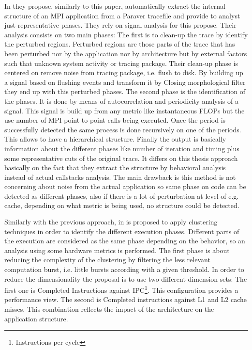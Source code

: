 \documentclass[10pt]{report}
\begin{document}
In \cite{casas2007automatic} they propose, similarly to this paper, 
automatically extract the internal structure of an MPI application from a
Paraver tracefile and provide to analyst just representative phases. 
They rely on signal analysis for this propose. 
Their analysis consists on two main phases:
The first is to clean-up the trace by identify the perturbed regions.
Perturbed regions are those parts of the trace that has been perturbed nor by
the application nor by architecture but by external factors such that unknown
system activity or tracing package. Their clean-up phase is centered on remove
noise from tracing package, i.e. flush to disk. By building up a signal based
on flushing events and transform it by Closing morphological filter they end up
with this perturbed phases. The second phase is the identification of the
phases. It is done by means of autocorrelation and periodicity analysis of a
signal. This signal is build up from any metric like instantaneous FLOPs but the
use number of MPI point to point calls being executed. Once the period is
successfully detected the same process is done recursively on one of the
periods. This allows to have a hierarchical structure. Finally the output is
basically information about the different phases like number of iteration and
timing plus some representative cuts of the original trace. It differs on this
thesis approach basically on the fact that they extract the structure by
behavioral analysis instead of actual callstacks analysis. The main drawback is
this method is not concerning about noise from the actual application so same
phase on code can be detected as different phases, also if there is a lot of
perturbation at level of e.g. cache, depending on what metric is being used, no
structure could be detected. 

Similarly with the previous approach, in 
\cite{gonzalez2013application} is proposed to apply clustering techniques in
order to identify the different execution phases. Different parts of the
execution are considered as the same phase depending on the behavior,
so an analysis using some hardware metrics is
performed. The first phase is about reducing the complexity of the clustering by
filtering the less relevant computation burst, i.e. little bursts according
with a given threshold. In order to reduce the dimensionality the proposal is to
use two different dimension sets: The first one is Completed Instructions
against IPC\footnote{Instructions per cycle}. This configuration provides a
performance view. The second is Completed instructions against L1 and L2 cache
misses. This combination reflects the impact of the architecture on the
application structure. 
\end{document}
